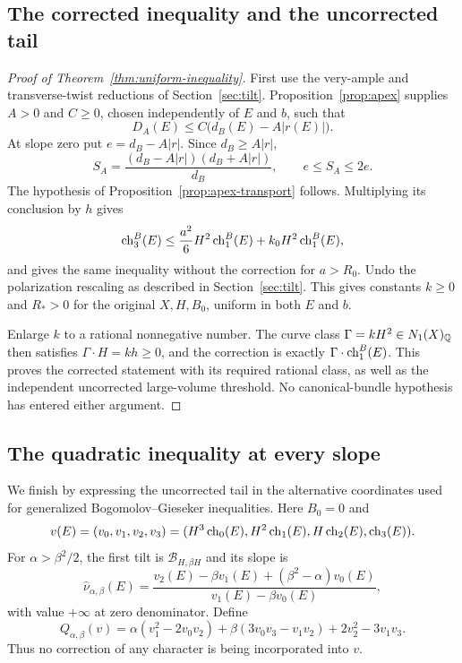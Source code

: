 \subsection{The corrected inequality and the uncorrected tail}

\begin{proof}[Proof of Theorem~\ref{thm:uniform-inequality}]
First use the very-ample and transverse-twist reductions of
Section~\ref{sec:tilt}.  Proposition~\ref{prop:apex} supplies
$A>0$ and $C\ge0$, chosen independently of $E$ and $b$, such that
\[
 D_A(E)\le C\bigl(d_B(E)-A|r(E)|\bigr).
\]
At slope zero put $e=d_B-A|r|$.  Since $d_B\ge A|r|$,
\[
 S_A=\frac{(d_B-A|r|)(d_B+A|r|)}{d_B},\qquad
 e\le S_A\le2e.
\]
The hypothesis of Proposition~\ref{prop:apex-transport} follows.
Multiplying its conclusion by $h$ gives
\[
 \operatorname{ch}_3^B(E)\le\frac{a^2}{6}H^2\operatorname{ch}_1^B(E)
                      +k_0H^2\operatorname{ch}_1^B(E),
\]
and gives the same inequality without the correction for $a>R_0$.
Undo the polarization rescaling as described in Section~\ref{sec:tilt}.
This gives constants $k\ge0$ and $R_*>0$ for the original
$X,H,B_0$, uniform in both $E$ and $b$.

Enlarge $k$ to a rational nonnegative number.  The curve class
$\Gamma=kH^2\in N_1(X)_{\mathbb Q}$ then satisfies
$\Gamma\cdot H=kh\ge0$, and the correction is exactly
$\Gamma\cdot\operatorname{ch}_1^B(E)$.  This proves the corrected statement
with its required rational class, as well as the independent
uncorrected large-volume threshold.  No canonical-bundle hypothesis
has entered either argument.
\end{proof}

\subsection{The quadratic inequality at every slope}

We finish by expressing the uncorrected tail in the alternative
coordinates used for generalized Bogomolov--Gieseker inequalities.
Here $B_0=0$ and
\[
 v(E)=(v_0,v_1,v_2,v_3)
 =(H^3\operatorname{ch}_0(E),H^2\operatorname{ch}_1(E),H\operatorname{ch}_2(E),\operatorname{ch}_3(E)).
\]
For $\alpha>\beta^2/2$, the first tilt is
$\mathcal B_{H,\beta H}$ and its slope is
\begin{equation}\label{eq:alternative-slope}
 \widehat\nu_{\alpha,\beta}(E)=
 \frac{v_2(E)-\beta v_1(E)+(\beta^2-\alpha)v_0(E)}
      {v_1(E)-\beta v_0(E)},
\end{equation}
with value $+\infty$ at zero denominator.  Define
\begin{equation}\label{eq:quadratic-form}
 Q_{\alpha,\beta}(v)=
 \alpha(v_1^2-2v_0v_2)+\beta(3v_0v_3-v_1v_2)
                      +2v_2^2-3v_1v_3.
\end{equation}
Thus no correction of any character is being incorporated into $v$.

